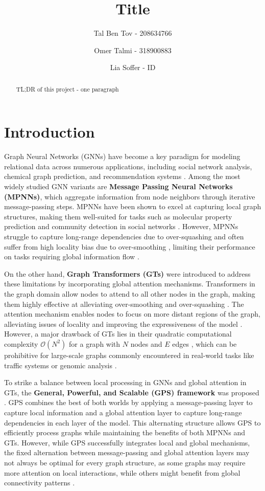 \documentclass{acmart}
\title{Title}
\author{Tal Ben Tov - 208634766}
\author{Omer Talmi - 318900883}
\author{Lia Soffer - ID}
\date{}
\begin{document}
\begin{abstract}
TL;DR of this project - one paragraph
\end{abstract}
\maketitle

\section{Introduction}

Graph Neural Networks (GNNs) have become a key paradigm for modeling relational data across numerous applications, including social network analysis, chemical graph prediction, and recommendation systems \cite{gilmer2017neural}. Among the most widely studied GNN variants are \textbf{Message Passing Neural Networks (MPNNs)}, which aggregate information from node neighbors through iterative message-passing steps. MPNNs have been shown to excel at capturing local graph structures, making them well-suited for tasks such as molecular property prediction and community detection in social networks \cite{gilmer2017neural}. However, MPNNs struggle to capture long-range dependencies due to over-squashing \cite{alon2021bottleneck} and often suffer from high locality bias due to over-smoothing \cite{oono2020expressive}, limiting their performance on tasks requiring global information flow \cite{dwivedi2020benchmarking}.

On the other hand, \textbf{Graph Transformers (GTs)} were introduced to address these limitations by incorporating global attention mechanisms. Transformers in the graph domain allow nodes to attend to all other nodes in the graph, making them highly effective at alleviating over-smoothing and over-squashing \cite{alon2021bottleneck, topping2021curvature}. The attention mechanism enables nodes to focus on more distant regions of the graph, alleviating issues of locality and improving the expressiveness of the model \cite{xu2019powerful, morris2019weisfeiler}. However, a major drawback of GTs lies in their quadratic computational complexity $\mathcal{O}(N^2)$ for a graph with $N$ nodes and $E$ edges \cite{vaswani2017attention}, which can be prohibitive for large-scale graphs commonly encountered in real-world tasks like traffic systems or genomic analysis \cite{dwivedi2020benchmarking,Chen2020}.

To strike a balance between local processing in GNNs and global attention in GTs, the \textbf{General, Powerful, and Scalable (GPS) framework} was proposed \cite{Rampasek2022}. GPS combines the best of both worlds by applying a message-passing layer to capture local information and a global attention layer to capture long-range dependencies in each layer of the model. This alternating structure allows GPS to efficiently process graphs while maintaining the benefits of both MPNNs and GTs. However, while GPS successfully integrates local and global mechanisms, the fixed alternation between message-passing and global attention layers may not always be optimal for every graph structure, as some graphs may require more attention on local interactions, while others might benefit from global connectivity patterns \cite{Bronstein2021}.
\end{document}
